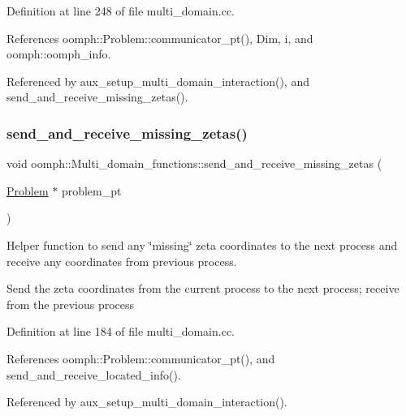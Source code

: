 Definition at line 248 of file multi\+\_\+domain.\+cc.



References oomph\+::\+Problem\+::communicator\+\_\+pt(), Dim, i, and oomph\+::oomph\+\_\+info.



Referenced by aux\+\_\+setup\+\_\+multi\+\_\+domain\+\_\+interaction(), and send\+\_\+and\+\_\+receive\+\_\+missing\+\_\+zetas().

\mbox{\label{namespaceoomph_1_1Multi__domain__functions_a2fb1a620c45f362039bef826b32b6785}} 
\subsubsection{\texorpdfstring{send\+\_\+and\+\_\+receive\+\_\+missing\+\_\+zetas()}{send\_and\_receive\_missing\_zetas()}}
{\footnotesize\ttfamily void oomph\+::\+Multi\+\_\+domain\+\_\+functions\+::send\+\_\+and\+\_\+receive\+\_\+missing\+\_\+zetas (\begin{DoxyParamCaption}\item[{\hyperlink{classoomph_1_1Problem}{Problem} $\ast$}]{problem\+\_\+pt }\end{DoxyParamCaption})}



Helper function to send any \char`\"{}missing\char`\"{} zeta coordinates to the next process and receive any coordinates from previous process. 

Send the zeta coordinates from the current process to the next process; receive from the previous process 

Definition at line 184 of file multi\+\_\+domain.\+cc.



References oomph\+::\+Problem\+::communicator\+\_\+pt(), and send\+\_\+and\+\_\+receive\+\_\+located\+\_\+info().



Referenced by aux\+\_\+setup\+\_\+multi\+\_\+domain\+\_\+interaction().

\mbox{\label{namespaceoomph_1_1Multi__domain__functions_a183b4aefc3af4799252a35f08e2743ee}} 
